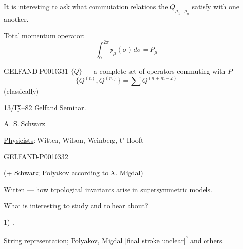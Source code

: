 It is interesting to ask what commutation relations the $Q_{\mu_1\ldots\mu_n}$ satisfy with one another.

Total momentum operator:
\begin{equation*}
\int_0^{2\pi}p_\mu(\sigma)\,d\sigma=P_\mu
\tag{27}
\end{equation*}


\begin{GelfandAdjacentEvidence}{GELFAND-P001033}{1}
$\{Q\}$ --- a complete set of operators commuting with $\underline{P}$
\[
\{Q^{(n)},Q^{(m)}\}=\sum Q^{(n+m-2)}
\]
(classically)

\underline{13/$\overline{\underline{\mathrm{IX}}}$--82 {}}\qquad \underline{Gelfand Seminar.}

\underline{A. S. Schwarz}

\underline{Physicists}: Witten, Wilson, Weinberg, t' Hooft
\end{GelfandAdjacentEvidence}
\begin{GelfandAdjacentEvidence}{GELFAND-P001033}{2}


(+ Schwarz; Polyakov according to A. Migdal)

Witten --- how topological invariants arise in supersymmetric models.

What is interesting to study and to hear about?

1) .

String representation; Polyakov, Migdal [final stroke unclear]\textsuperscript{?} and others.
\end{GelfandAdjacentEvidence}
